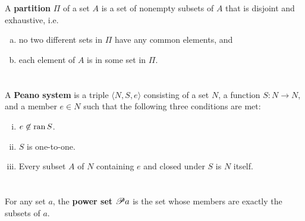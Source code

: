 \documentclass{report}
\begin{document}
\section{}%

A \textbf{partition} $\Pi$ of a set $A$ is a set of nonempty subsets of $A$ that
  is disjoint and exhaustive, i.e.
  \begin{enumerate}[(a)]
    \item no two different sets in $\Pi$ have any common elements, and
    \item each element of $A$ is in some set in $\Pi$.
  \end{enumerate}

\begin{definition}


\end{definition}

\section{}%

A \textbf{Peano system} is a triple $\langle N, S, e \rangle$ consisting of a
  set $N$, a function $S \colon N \rightarrow N$, and a member $e \in N$ such
  that the following three conditions are met:
\begin{enumerate}[(i)]
  \item $e \not\in \mathop{\text{ran}}{S}$.
  \item $S$ is one-to-one.
  \item Every subset $A$ of $N$ containing $e$ and closed under $S$ is $N$
    itself.
\end{enumerate}

\begin{definition}


\end{definition}

\section{}%

For any set $a$, the \textbf{power set $\mathscr{P}a$} is the set whose members
  are exactly the subsets of $a$.
\end{document}
